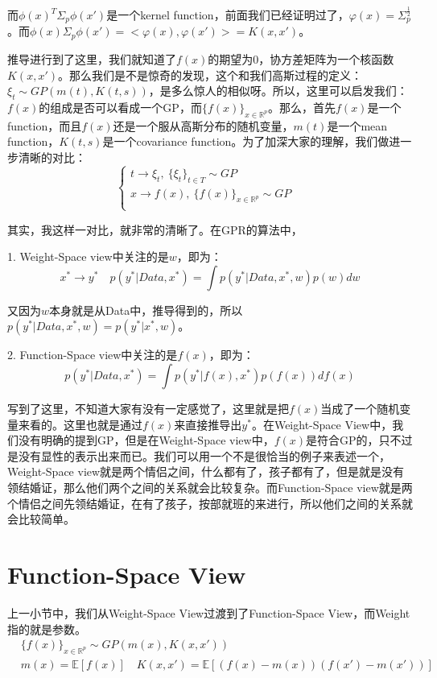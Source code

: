 \documentclass[a4paper]{article}
\begin{document}
而$\phi(x)^T\Sigma_p\phi(x')$是一个kernel function，前面我们已经证明过了，$\varphi(x) = \Sigma_p^{\frac{1}{2}}$。而$\phi(x)\Sigma_p\phi(x') = <\varphi(x),\varphi(x')> = K(x,x')$。

推导进行到了这里，我们就知道了$f(x)$的期望为0，协方差矩阵为一个核函数$K(x,x')$。那么我们是不是惊奇的发现，这个和我们高斯过程的定义：$\xi_t \sim GP(m(t),K(t,s))$，是多么惊人的相似呀。所以，这里可以启发我们：{\color{red} $f(x)$的组成是否可以看成一个GP，而$\{f(x)\}_{x\in\mathbb{R}^p}$。}那么，首先$f(x)$是一个function，而且$f(x)$还是一个服从高斯分布的随机变量，$m(t)$是一个mean function，$K(t,s)$是一个covariance function。为了加深大家的理解，我们做进一步清晰的对比：
\begin{equation}
    \left\{
        \begin{array}{ll}
            t \longrightarrow \xi_t, \ \{ \xi_t \}_{t\in T}\sim GP & \\
            x \longrightarrow f(x), \ \{ f(x) \}_{x\in \mathbb{R}^p}\sim GP & \\
\end{array}
\right.
\end{equation}

其实，我这样一对比，就非常的清晰了。在GPR的算法中，

1. Weight-Space view中关注的是$w$，即为：
\begin{equation}
    x^\ast \longrightarrow y^\ast \quad p(y^\ast|Data,x^\ast) = \int p(y^\ast|Data,x^\ast,w)p(w)dw
\end{equation}

又因为$w$本身就是从Data中，推导得到的，所以$p(y^\ast|Data,x^\ast,w) = p(y^\ast|x^\ast,w)$。

2. Function-Space view中关注的是$f(x)$，即为：
\begin{equation}
    p(y^\ast | Data,x^\ast)  = \int p(y^\ast | f(x),x^\ast)p(f(x))df(x)
\end{equation}

写到了这里，不知道大家有没有一定感觉了，这里就是把$f(x)$当成了一个随机变量来看的。这里也就是通过$f(x)$来直接推导出$y^\ast$。在Weight-Space View中，我们没有明确的提到GP，但是在Weight-Space view中，$f(x)$是符合GP的，只不过是没有显性的表示出来而已。我们可以用一个不是很恰当的例子来表述一个，Weight-Space view就是两个情侣之间，什么都有了，孩子都有了，但是就是没有领结婚证，那么他们两个之间的关系就会比较复杂。而Function-Space view就是两个情侣之间先领结婚证，在有了孩子，按部就班的来进行，所以他们之间的关系就会比较简单。

\section{Function-Space View}
上一小节中，我们从Weight-Space View过渡到了Function-Space View，而Weight指的就是参数。
\begin{equation}
    \begin{split}
        & \{f(x)\}_{x\in\mathbb{R}^p}\sim GP(m(x),K(x,x')) \\
        & m(x) = \mathbb{E}[f(x)] \quad K(x,x') = \mathbb{E}[(f(x)-m(x))(f(x')-m(x'))]
    \end{split}
\end{equation}
\end{document}
